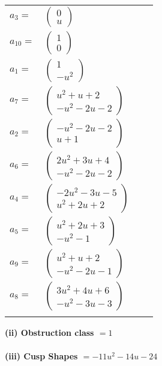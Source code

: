 \documentclass[1p]{elsarticle_modified}
\theoremstyle{definition}
\begin{document}
\begin{tabular}{m{7pt} m{180pt} m{7pt} m{180pt} }
\flushright $a_{3}=$&$\begin{pmatrix}0\\u\end{pmatrix}$ \\
\flushright $a_{10}=$&$\begin{pmatrix}1\\0\end{pmatrix}$ \\
\flushright $a_{1}=$&$\begin{pmatrix}1\\- u^2\end{pmatrix}$ \\
\flushright $a_{7}=$&$\begin{pmatrix}u^2+u+2\\- u^2-2 u-2\end{pmatrix}$ \\
\flushright $a_{2}=$&$\begin{pmatrix}- u^2-2 u-2\\u+1\end{pmatrix}$ \\
\flushright $a_{6}=$&$\begin{pmatrix}2 u^2+3 u+4\\- u^2-2 u-2\end{pmatrix}$ \\
\flushright $a_{4}=$&$\begin{pmatrix}-2 u^2-3 u-5\\u^2+2 u+2\end{pmatrix}$ \\
\flushright $a_{5}=$&$\begin{pmatrix}u^2+2 u+3\\- u^2-1\end{pmatrix}$ \\
\flushright $a_{9}=$&$\begin{pmatrix}u^2+u+2\\- u^2-2 u-1\end{pmatrix}$ \\
\flushright $a_{8}=$&$\begin{pmatrix}3 u^2+4 u+6\\- u^2-3 u-3\end{pmatrix}$\\&\end{tabular}
\flushleft \textbf{(ii) Obstruction class $= 1$}\\~\\
\flushleft \textbf{(iii) Cusp Shapes $= -11 u^2-14 u-24$}\\~\\
\end{document}

